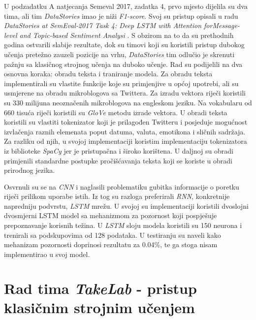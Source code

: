 \documentclass[times, utf8, zavrsni]{fer}
\begin{document}
U podzadatku A natjecanja Semeval 2017, zadatka 4, prvo mjesto dijelila su dva tima, ali tim \textit{DataStories} imao je niži \textit{F1-score}. Svoj su pristup opisali u radu \textit{DataStories at SemEval-2017 Task 4: Deep LSTM with Attention forMessage-level and Topic-based Sentiment Analysi} \citep{datastore-Semeval}. S obzirom na to da su prethodnih godina ostvarili slabije rezultate, dok su timovi koji su koristili pristup dubokog učenja pretežno zauzeli pozicije na vrhu, \textit{DataStories} tim odlučio je skrenuti pažnju sa klasičnog strojnog učenja na duboko učenje. Rad su podijelili na dva osnovna koraka: obradu teksta i traniranje modela. Za obradu teksta implementirali su vlastite funkcije koje su primjenjive u općoj upotrebi, ali su usmjerene na obradu mikroblogova sa Twittera. Za izradu vektora riječi koristili su 330 milijuna neoznačenih mikroblogova na engleskom jeziku. Na vokabularu od 660 tisuća riječi koristili su \textit{GloVe} metodu izrade vektora. U obradi teksta koristili su vlastiti tokenizator koji je prilagođen Twitteru i posjeduje mogućnost izvlačenja raznih elemenata poput datuma, valuta, emotikona i sličnih sadržaja. Za razliku od njih, u svojoj implementaciji koristim implementaciju tokenizatora iz biblioteke \textit{SpaCy} jer je pristupačna i široko korištena. U daljnoj su obradi primjenili standardne postupke pročišćavanja teksta koji se koriste u obradi prirodnog jezika.

Osvrnuli su se na \textit{CNN} i naglasili problematiku gubitka informacije o poretku riječi prilikom uporabe istih. Iz tog su razloga preferirali \textit{RNN}, konkretnije napredniju podvrstu, \textit{LSTM} mrežu.  U svojoj su implementaciji koristili dvoslojni dvosmjerni LSTM model sa mehanizmom za pozornost koji pospješuje prepoznavanje korisnih težina. U \textit{LSTM} sloju modela koristili su 150 neurona i trenirali sa podskupovima od 128 podataka. U testiranju su naveli kako mehanizam pozornosti doprinosi rezultatu za 0.04\%, te ga stoga nisam implementirao u svoj model.


\section{Rad tima \textit{TakeLab} - pristup klasičnim strojnim učenjem}
\end{document}
